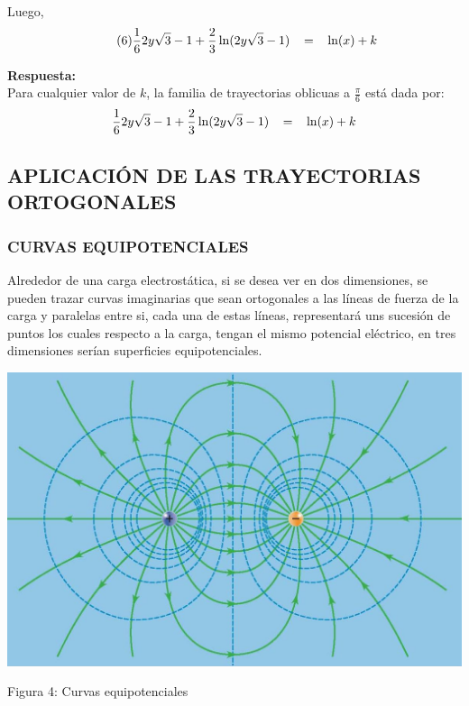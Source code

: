 \documentclass[12pt,letterpaper]{article}
\begin{document}
\begin{titlepage}
\begin{flushleft}

Luego,
\begin{equation} \tag{6} \label{met6}
\frac{1}{6} 2y \sqrt{3} -1 + \frac{2}{3} \ln (2y \sqrt{3} - 1) \hspace{0.3cm} = \hspace{0.3 cm} \ln(x) + k
\end{equation}

\textbf{Respuesta:}\\
\vspace{0.5cm}
Para cualquier valor de $k$, la familia de trayectorias oblicuas a $\frac{\pi}{6}$ está dada por:
\begin{equation*}
\frac{1}{6} 2y \sqrt{3} -1 + \frac{2}{3} \ln (2y \sqrt{3} - 1)\hspace{0.3 cm} = \hspace{0.3 cm} \ln(x) + k
\end{equation*}

\subsection{APLICACIÓN DE LAS TRAYECTORIAS ORTOGONALES}
\subsubsection{CURVAS EQUIPOTENCIALES}
Alrededor de una carga electrostática, si se desea ver en dos dimensiones, se pueden trazar curvas imaginarias que sean ortogonales a las líneas de fuerza de la carga y paralelas entre si, cada una de estas líneas, representará uns sucesión de puntos los cuales respecto a la carga, tengan el mismo potencial eléctrico, en tres dimensiones serían superficies equipotenciales.
\vspace{1cm}  


\centering
\includegraphics[scale=0.45]{Curvas equipotenciales}

Figura 4: Curvas equipotenciales


\end{flushleft}
\end{titlepage}
\end{document}
